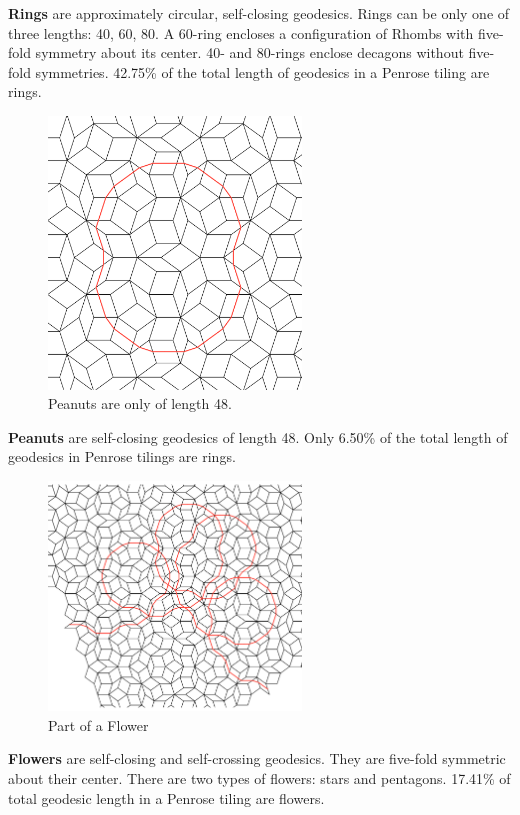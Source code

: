 \documentclass[
  oneside,
  11pt, a4paper,
  footinclude=true,
  headinclude=true,
  cleardoublepage=empty
]{scrbook}
\begin{document}
\textbf{Rings} are approximately circular, self-closing geodesics. Rings can be only one of three lengths: 40, 60, 80. A 60-ring encloses a configuration of Rhombs with five-fold symmetry about its center. 40- and 80-rings enclose decagons without five-fold symmetries. 42.75\% of the total length of geodesics in a Penrose tiling are rings.

\begin{figure}[H]
\centering
\includegraphics[width=0.6\textwidth]{Peanut}
\caption[Peanut]{Peanuts are only of length 48.}
\end{figure}
\textbf{Peanuts} are self-closing geodesics of length 48. Only 6.50\% of the total length of geodesics in Penrose tilings are rings. 
\begin{figure}[H]
\centering
\includegraphics[width=0.6\textwidth]{FlowerPart}
\caption[Flower Part]{Part of a Flower}
\end{figure}
\textbf{Flowers} are self-closing and self-crossing geodesics. They are five-fold symmetric about their center. There are two types of flowers: stars and pentagons. 17.41\% of total geodesic length in a Penrose tiling are flowers. 
\end{document}
